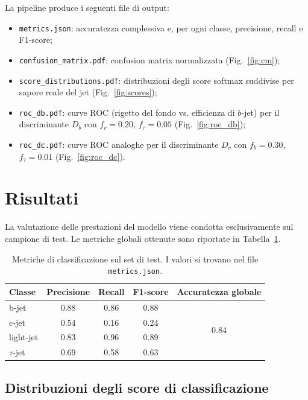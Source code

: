 \documentclass[11pt,a4paper]{article}
\begin{document}
La pipeline produce i seguenti file di output:
\begin{itemize}[topsep=1pt, itemsep=0pt, parsep=1pt]
    \item \texttt{metrics.json}: accuratezza complessiva e, per ogni classe, precisione, recall e F1-score;
    \item \texttt{confusion\_matrix.pdf}: confusion matrix normalizzata (Fig.~\ref{fig:cm});
    \item \texttt{score\_distributions.pdf}: distribuzioni degli score softmax suddivise per sapore reale del jet (Fig.~\ref{fig:scores});
    \item \texttt{roc\_db.pdf}: curve ROC (rigetto del fondo vs. efficienza di $b$-jet) per il discriminante $D_b$ con $f_c = 0.20$, $f_\tau = 0.05$ (Fig.~\ref{fig:roc_db});
    \item \texttt{roc\_dc.pdf}: curve ROC analoghe per il discriminante $D_c$ con $f_b = 0.30$, $f_\tau = 0.01$ (Fig.~\ref{fig:roc_dc}).
\end{itemize}


\section{Risultati}\label{sec:risultati}

La valutazione delle prestazioni del modello viene condotta esclusivamente sul campione di test.
Le metriche globali ottenute sono riportate in Tabella~\ref{tab:metrics}.

\begin{table}[!ht]
    \centering
    \begin{tabular}{lcccc}
        \toprule
        Classe & Precisione & Recall & F1-score & Accuratezza globale \\
        \midrule
        b-jet       & 0.88 & 0.86 & 0.88 & \multirow{4}{*}{0.84} \\
        c-jet       & 0.54 & 0.16 & 0.24 & \\
        light-jet   & 0.83 & 0.96 & 0.89 & \\
        $\tau$-jet  & 0.69 & 0.58 & 0.63 & \\
        \bottomrule
    \end{tabular}
    \caption{Metriche di classificazione sul set di test. I valori si trovano nel file \texttt{metrics.json}.}
    \label{tab:metrics}
\end{table}

\subsection{Distribuzioni degli score di classificazione}
\end{document}
